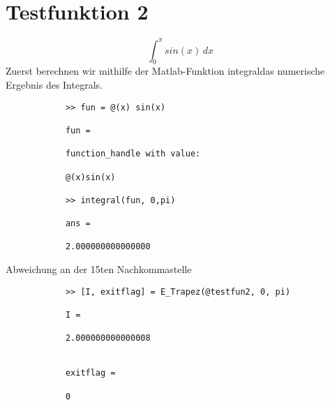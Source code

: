 \documentclass[11pt,titlepage]{article}
\begin{document}
	\section{Testfunktion 2}
		\begin{displaymath}
			\int_0^{\pi} sin(x) \, dx\
		\end{displaymath}
		Zuerst berechnen wir mithilfe der Matlab-Funktion \glqq integral\grqq  das numerische Ergebnis des Integrals.
		\begin{lstlisting}
			>> fun = @(x) sin(x)
			
			fun =
			
			function_handle with value:
			
			@(x)sin(x)
			
			>> integral(fun, 0,pi)
			
			ans =
			
			2.000000000000000
		\end{lstlisting}
		Abweichung an der 15ten Nachkommastelle
		\begin{lstlisting}
			>> [I, exitflag] = E_Trapez(@testfun2, 0, pi)
			
			I =
			
			2.000000000000008
			
			
			exitflag =
			
			0
		\end{lstlisting}
	
\end{document}
